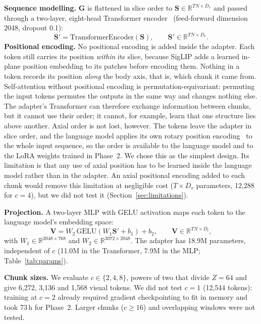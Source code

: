 \documentclass[conference]{IEEEtran}
\begin{document}
\textbf{Sequence modelling.} $\mathbf{G}$ is flattened in slice order to
$\mathbf{S}\in\mathbb{R}^{TN\times D_v}$ and passed through a two-layer,
eight-head Transformer encoder~\cite{transformer} (feed-forward dimension
2048, dropout 0.1):
\begin{equation}
\mathbf{S}'=\mathrm{TransformerEncoder}(\mathbf{S}),\qquad
\mathbf{S}'\in\mathbb{R}^{TN\times D_v}.
\end{equation}
\textbf{Positional encoding.} No positional encoding is added inside the
adapter. Each token still carries its position \emph{within} its slice,
because SigLIP adds a learned in-plane position embedding to its patches
before encoding them. Nothing in a token records its position \emph{along}
the body axis, that is, which chunk it came from. Self-attention without
positional encoding is permutation-equivariant: permuting the input tokens
permutes the outputs in the same way and changes nothing else. The adapter's
Transformer can therefore exchange information between chunks, but it cannot
use their order; it cannot, for example, learn that one structure lies above
another. Axial order is not lost, however. The tokens leave the adapter in
slice order, and the language model applies its own rotary position
encoding~\cite{roformer} to the whole input sequence, so the order is
available to the language model and to the LoRA weights trained in Phase~2.
We chose this as the simplest design. Its limitation is that any use of axial
position has to be learned inside the language model rather than in the
adapter. An axial positional encoding added to each chunk would remove this
limitation at negligible cost ($T\times D_v$ parameters, 12,288 for $c=4$),
but we did not test it (Section~\ref{sec:limitations}).

\textbf{Projection.} A two-layer MLP with GELU activation maps each token to
the language model's embedding space:
\begin{equation}
\mathbf{V}=W_2\,\mathrm{GELU}(W_1\mathbf{S}'+b_1)+b_2,\qquad
\mathbf{V}\in\mathbb{R}^{TN\times D_l},
\end{equation}
with $W_1\in\mathbb{R}^{2048\times 768}$ and
$W_2\in\mathbb{R}^{3072\times 2048}$. The adapter has 18.9M parameters,
independent of $c$ (11.0M in the Transformer, 7.9M in the MLP;
Table~\ref{tab:params}).

\textbf{Chunk sizes.} We evaluate $c\in\{2,4,8\}$, powers of two that divide
$Z=64$ and give 6,272, 3,136 and 1,568 visual tokens. We did not test $c=1$
(12,544 tokens): training at $c=2$ already required gradient checkpointing to
fit in memory and took 73\,h for Phase~2. Larger chunks ($c\ge16$) and
overlapping windows were not tested.
\end{document}
